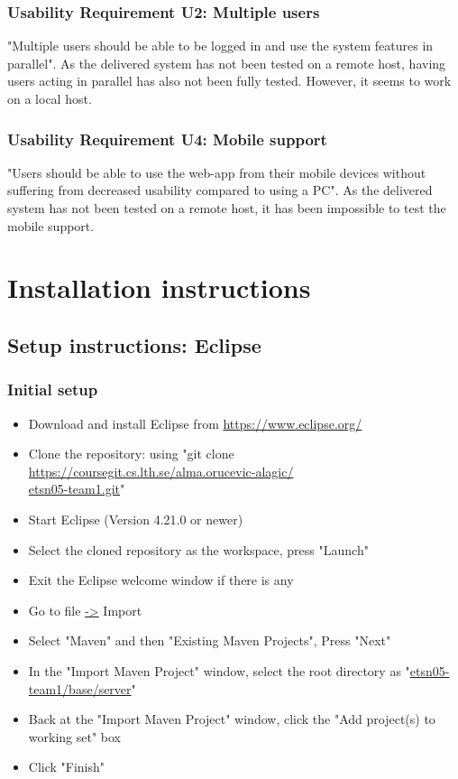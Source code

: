 \documentclass{article}
\begin{document}
\subsubsection{Usability Requirement U2: Multiple users}
"Multiple users should be able to be logged in and use the system features in parallel"\cite{PRD}. As the delivered system has not been tested on a remote host, having users acting in parallel has also not been fully tested. However, it seems to work on a local host.

\subsubsection{Usability Requirement U4: Mobile support}
"Users should be able to use the web-app from their mobile devices without suffering from decreased usability compared to using a PC"\cite{PRD}. As the delivered system has not been tested on a remote host, it has been impossible to test the mobile support.

\section{Installation instructions} %
\subsection{Setup instructions: Eclipse}
\subsubsection{Initial setup}
\begin{itemize}
\item Download and install Eclipse from \url{https://www.eclipse.org/}
\item Clone the repository: using "git clone \url{https://coursegit.cs.lth.se/alma.orucevic-alagic/} \\ 
\url{etsn05-team1.git}"
\item Start Eclipse (Version 4.21.0 or newer)
\item Select the cloned repository as the workspace, press "Launch"
\item Exit the Eclipse welcome window if there is any
\item Go to file \url{->} Import
\item Select "Maven" and then "Existing Maven Projects", Press "Next"
\item In the "Import Maven Project" window, select the root directory as "\url{etsn05-team1/base/server}"
\item Back at the "Import Maven Project" window, click the "Add project(s) to working set" box
\item Click "Finish"
\end{itemize}
\end{document}

